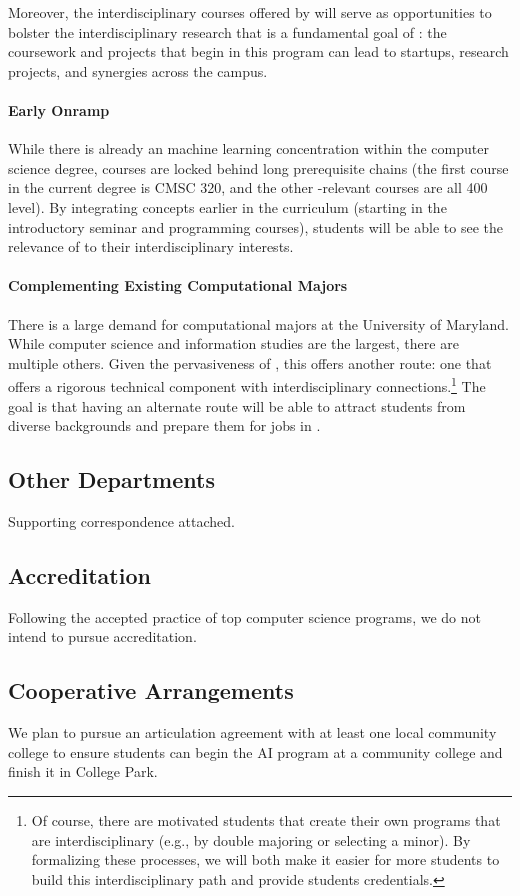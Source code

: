 Moreover, the interdisciplinary courses offered by \short{} will serve as opportunities to bolster the interdisciplinary research that is a fundamental goal of \aim{}: the coursework and projects that begin in this program can lead to startups, research projects, and synergies across the campus.

\paragraph{Early Onramp}

While there is already an machine learning  concentration within the computer science degree,  courses are locked behind long prerequisite chains (the first course in the current  degree is CMSC 320, and the other -relevant courses are all 400 level).  
%
By integrating  concepts earlier in the curriculum (starting in the introductory seminar and programming courses), students will be able to see the relevance of  to their interdisciplinary interests.

\paragraph{Complementing Existing Computational Majors}

There is a large demand for computational majors at the University of Maryland.  
%
While computer science and information studies are the largest, there are multiple others.
%
Given the pervasiveness of , this offers another route: one that offers a rigorous technical component with interdisciplinary connections.\footnote{Of course, there are motivated students that create their own programs that are interdisciplinary (e.g., by double majoring or selecting a minor).  By formalizing these processes, we will both make it easier for more students to build this interdisciplinary path and provide students credentials.}
%
The goal is that having an alternate route will be able to attract students from diverse backgrounds and prepare them for jobs in . 

\subsection{Other Departments}

Supporting correspondence attached.

\subsection{Accreditation}

Following the accepted practice of top computer science programs, we do not intend to pursue accreditation.

\subsection{Cooperative Arrangements}

We plan to pursue an articulation agreement with at least one local community college to ensure students can begin the AI program at a community college and finish it in College Park.